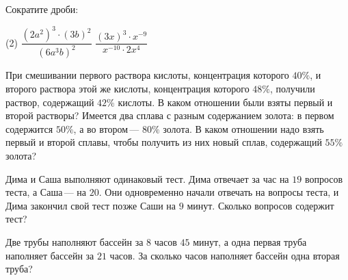 \begin{homework}[number=1]
	\begin{listofex}\item Сократите дроби:
		\begin{tasks}(2)
			\task \( \dfrac{(2a^2)^3\cdot(3b)^2}{(6a^3b)^2} \)
			\task \( \dfrac{(3x)^3\cdot x^{-9}}{x^{-10}\cdot2x^4} \)
		\end{tasks}
		\item При смешивании первого раствора кислоты, концентрация которого \( 40\% \), и второго раствора этой же кислоты, концентрация которого \( 48\% \), получили раствор, содержащий \( 42\% \) кислоты. В каком отношении были взяты первый и второй растворы?
		Имеется два сплава с разным содержанием золота: в первом содержится \( 50\% \), а во втором --- \( 80\% \) золота. В каком отношении надо взять первый и второй сплавы, чтобы получить из них новый сплав, содержащий \( 55\% \) золота?
		\item Дима и Саша выполняют одинаковый тест. Дима отвечает за час на \( 19 \) вопросов теста, а Саша --- на \( 20 \). Они одновременно начали отвечать на вопросы теста, и Дима закончил свой тест позже Саши на \( 9 \) минут. Сколько вопросов содержит тест?
		\item Две трубы наполняют бассейн за \( 8 \) часов \( 45 \) минут, а одна первая труба наполняет бассейн за \( 21 \) часов. За сколько часов наполняет бассейн одна вторая труба?
	\end{listofex}
\end{homework}

